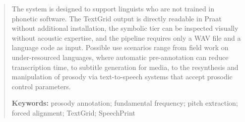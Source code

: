 \begin{abstract}
The system is designed to support linguists who are not trained in phonetic software. The TextGrid output is directly readable in Praat without additional installation, the symbolic tier can be inspected visually without acoustic expertise, and the pipeline requires only a WAV file and a language code as input. Possible use scenarios range from field work on under-resourced languages, where automatic pre-annotation can reduce transcription time, to subtitle generation for media, to the resynthesis and manipulation of prosody via text-to-speech systems that accept prosodic control parameters.

\bigskip
\noindent\textbf{Keywords:} prosody annotation; fundamental frequency; pitch extraction; forced alignment; TextGrid; SpeechPrint


\newpage
\end{abstract}
